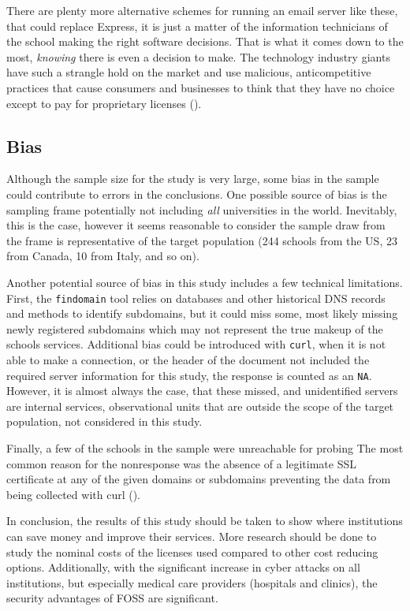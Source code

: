 \documentclass{article}
\theoremstyle{definition}
\begin{document}
\begin{flushleft}
\begin{multicols}{2}
There are plenty more alternative schemes for running an email server like
these, that could replace Express, it is just a matter of
the information technicians of the school making the right software
decisions. That is what it comes down to the most, \textit{knowing}
there is even a decision to make. The technology industry giants have
such a strangle hold on the market and use malicious, anticompetitive
practices that cause consumers and businesses to think that they have
no choice except to pay for proprietary licenses (\cite{win2015}).

\subsection{Bias}
Although the sample size for the study is very large, some bias in the sample
could contribute to errors in the conclusions. One possible source of bias
is the sampling frame potentially not including \textit{all} universities in
the world. Inevitably, this is the case, however it seems reasonable to consider
the sample draw from the frame is representative of the target population
(244 schools from the US, 23 from Canada, 10 from Italy, and so on).

Another potential source of bias in this study includes a few technical
limitations. First, the \texttt{findomain} tool relies on databases and
other historical DNS records and methods to identify subdomains, but it
could miss some, most likely missing newly registered subdomains which
may not represent the true makeup of the schools services. Additional
bias could be introduced with \texttt{curl}, when it is not able
to make a connection, or the header of the document not included the required
server information for this study, the response is counted as an \texttt{NA}.
However, it is almost always the case, that these
missed, and unidentified servers are internal services, observational units that
are outside the scope of the target population, not considered in this study.

Finally, a few of the schools in the sample were unreachable for probing
The most common reason for the nonresponse was the absence of a
legitimate SSL certificate at any of the given domains or subdomains
preventing the data from being collected with curl
(\cite{curlSSL}).

In conclusion, the results of this study should
be taken to show where institutions can save money and improve their services.
More research should be done to study the nominal costs of the licenses
used compared to other cost reducing options. Additionally, with the
significant increase in cyber attacks on all institutions, but especially
medical care providers (hospitals and clinics), the security advantages of
FOSS are significant.

\end{multicols}
\end{flushleft}
\printbibliography
\end{document}
